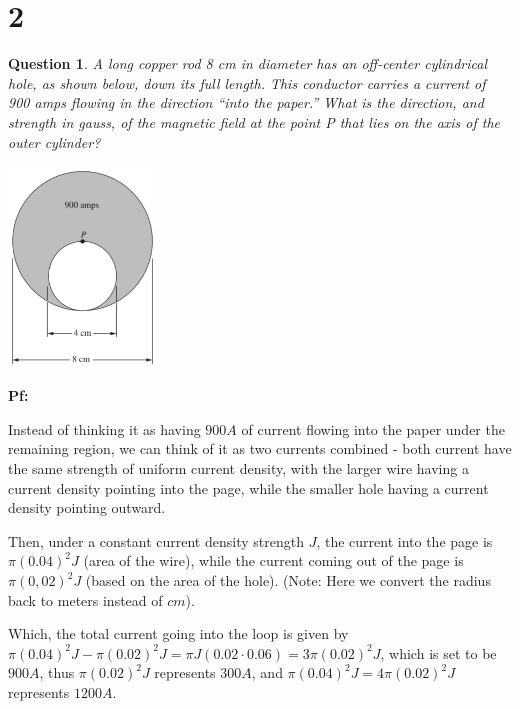 \documentclass{article}
\newtheorem{question}{Question}
\begin{document}
\hfill

\hfill

\section*{2}
\begin{myBox}[]{}
    \begin{question}
        A long copper rod 8 cm in diameter has an off-center cylindrical
        hole, as shown below, down its full length. This conductor
        carries a current of 900 amps flowing in the direction “into the
        paper.” What is the direction, and strength in gauss, of the magnetic
        field at the point P that lies on the axis of the outer cylinder?
    \end{question}

    \begin{center}
        \includegraphics*[width=40mm]{Purcell 6.37.png}
    \end{center}
\end{myBox}

\textbf{Pf:}

Instead of thinking it as having $900A$ of current flowing into the paper under the remaining region,
we can think of it as two currents combined - both current have the same strength of uniform current density,
with the larger wire having a current density pointing into the page, while the smaller hole having a current density pointing outward.

Then, under a constant current density strength $J$, the current into the page is $\pi (0.04)^2 J$ (area of the wire),
while the current coming out of the page is $\pi (0,02)^2 J$ (based on the area of the hole).
(Note: Here we convert the radius back to meters instead of $cm$).

Which, the total current going into the loop is given by $\pi (0.04)^2J-\pi(0.02)^2J = \pi J(0.02\cdot 0.06) = 3\pi (0.02)^2 J$, which is 
set to be $900A$, thus $\pi(0.02)^2J$ represents $300A$, and $\pi(0.04)^2J = 4\pi(0.02)^2J$ represents $1200A$.
\end{document}

